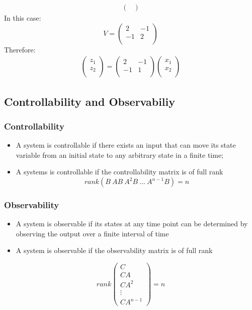 \documentclass[12pt,a4paper]{article}
\begin{document}
\begin{tcolorbox}[breakable]
\begin{itemize}
\begin{gather*}
\begin{pmatrix}
\end{pmatrix}
\end{gather*}
In this case:
\[V = \begin{pmatrix}
2&-1\\
-1&2\\
\end{pmatrix}\]
Therefore:
\begin{gather*}
\begin{pmatrix}
z_{1}\\
z_{2}\\
\end{pmatrix}
= 
\begin{pmatrix}
2&-1\\
-1&1\\
\end{pmatrix}
\begin{pmatrix}
x_{1}\\
x_{2}\\
\end{pmatrix}
\end{gather*}
\end{itemize}
\end{tcolorbox}

\subsection{Controllability and Observabiliy}

\subsubsection{Controllability}
\begin{itemize}
\item A system is controllable if there exists an input that can move its state variable from an initial state to any arbitrary state in a finite time;
\item A systems is controllable if the controllability matrix is of full rank
\[rank (B \ AB\ A^{2}B \ ...\ A^{n-1}B)=n\]
\end{itemize}

\subsubsection{Observability}
\begin{itemize}
\item A system is observable if its states at any time point can be determined by observing the output over a finite interval of time
\item A system is observable if the observability matrix is of full rank
\end{itemize}
\[rank \begin{pmatrix}
C\\
CA\\
CA^{2}\\
\vdots\\
CA^{n-1}
\end{pmatrix} =n
\]
\end{document}

